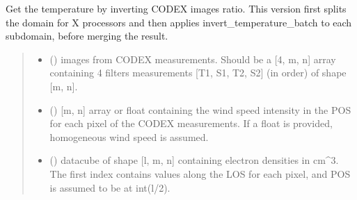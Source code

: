 \documentclass[letterpaper,10pt,english]{sphinxmanual}
\begin{document}
\begin{fulllineitems}
\label{\detokenize{doppler_dimming_lib:doppler_dimming_lib.inversion.invert_temperature_parallel}}
\pysigstartsignatures
{}
\pysigstopsignatures
\sphinxAtStartPar
Get the temperature by inverting CODEX images ratio. This version first splits the domain for X processors and then applies invert\_temperature\_batch to each subdomain, before merging the result.
\begin{quote}\begin{description}
\begin{itemize}
\item {} 
\sphinxAtStartPar
{} () \textendash{} images from CODEX measurements. Should be a {[}4, m, n{]} array containing 4 filters measurements {[}T1, S1, T2, S2{]} (in order) of shape {[}m, n{]}.

\item {} 
\sphinxAtStartPar
{} () \textendash{} {[}m, n{]} array or float containing the wind speed intensity in the POS for each pixel of the CODEX measurements. If a float is provided, homogeneous wind speed is assumed.

\item {} 
\sphinxAtStartPar
{} () \textendash{} datacube of shape {[}l, m, n{]} containing electron densities in cm\textasciicircum{}\sphinxhyphen{}3. The first index contains values along the LOS for each pixel, and POS is assumed to be at int(l/2).


\end{itemize}
\end{description}
\end{quote}
\end{fulllineitems}
\end{document}
